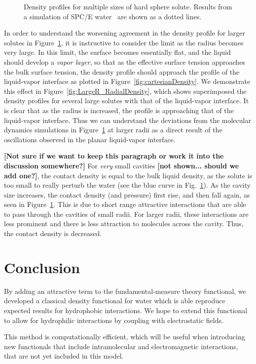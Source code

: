 \documentclass[letterpaper,twocolumn,amsmath,amssymb,prb]{revtex4}
\newcommand{\red}[1]{{\bf \color{red} #1}}
\newcommand{\fixme}[1]{\red{[#1]}}
\begin{document}
\begin{figure}[b]
\begin{center}
\end{center}
\caption{Density profiles for multiple sizes of hard sphere solute.
  Results from a simulation of SPC/E water~\cite{huang2001shs} are
  shown as a dotted lines.}
\label{fig:cavities}
\end{figure}

In order to understand the worsening agreement in the density profile
for larger solutes in Figure~\ref{fig:cavities}, it is instructive to
consider the limit as the radius becomes very large.  In this limit,
the surface becomes essentially flat, and the liquid should develop a
\emph{vapor layer}, so that as the effective surface tension
approaches the bulk surface tension, the density profile should
approach the profile of the liquid-vapor interface as plotted in
Figure~\ref{fig:cartesianDensity}.  We demonstrate this effect in
Figure~\ref{fig:LargeR_RadialDensity}, which shows superimposed the
density profiles for several large solutes with that of the
liquid-vapor interface.  It is clear that as the radius is increased,
the profile is approaching that of the liquid-vapor interface.  Thus
we can understand the deviations from the molecular dynamics
simulations in Figure~\ref{fig:cavities} at larger radii as a direct
result of the oscillations observed in the planar liquid-vapor
interface.

\fixme{Not sure if we want to keep this paragraph or work it into the
  discussion somewhere?} For \emph{very} small cavities \fixme{not
  shown... should we add one?}, the contact density is equal to the
bulk liquid density, as the solute is too small to really perturb the
water (see the blue curve in Fig.~\ref{fig:cavities}).  As the cavity
size increases, the contact density (and pressure) first rise, and
then fall again, as seen in Figure~\ref{fig:cavities}.  This is due to
short range attractive interactions that are able to pass through the
cavities of small radii.  For larger radii, these interactions are
less prominent and there is less attraction to molecules across the
cavity.  Thus, the contact density is decreased.

\section{Conclusion}
By adding an attractive term to the fundamental-measure theory
functional, we developed a classical density functional for water
which is able reproduce expected results for hydrophobic
interactions.  We hope to extend this functional to allow for
hydrophilic interactions by coupling with electrostatic fields.

This method is computationally efficient, which will be useful when
introducing new functionals that include intramolecular and electromagnetic
interactions, that are not yet included in this model.

\end{document}
